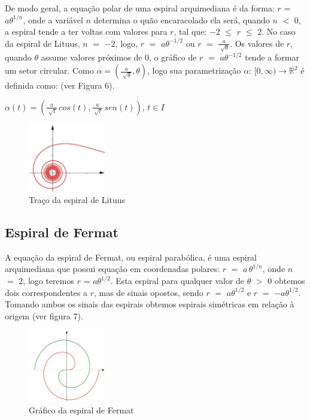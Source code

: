 \documentclass[twoside,a4paper,10pt]{article}
\newcommand{\R}{\mathbb R} %
\begin{document}
De modo geral, a equação polar de uma espiral arquimediana é da forma: $r$ = $a\theta^{1/n}$, onde a variável $n$ determina o quão encaracolado ela será, quando $n$ $<$ $0$, a espiral tende a ter voltas com valores para $r$, tal que: $-2$ $\leq$ $r$ $\leq$ $2$. No caso da espiral de Lituus, $n$ $=$ $-2$, logo, $r$ $=$ $a\theta^{-1/2}$ ou $r$ $=$ $\frac{a}{\sqrt[]{\theta}}$. Os valores de $r$, quando $\theta$ assume valores próximos de $0$, o gráfico de $r$ $=$ $a\theta^{-1/2}$ tende a formar um setor circular. Como $\alpha = \left(\frac{a}{\sqrt[]{\theta}}, \theta\right)$, logo sua parametrização $\alpha$: $[0, \infty) \rightarrow \R^2$ é definida como: (ver Figura 6).

\begin{center}
	$\alpha(t) = \left(\frac{a}{\sqrt[]{t}}\,cos(t), \frac{a}{\sqrt[]{t}}\,sen(t)\right)$, $t\in I$
\end{center}

\begin{figure}[h!]
	\centering
	\includegraphics[width=0.3\textwidth]{lituus}
	\caption{Traço da espiral de Lituus}
\end{figure}

\subsection{Espiral de Fermat}

A equação da espiral de Fermat, ou espiral parabólica, é uma espiral arquimediana que possui equação em coordenadas polares: $r$ $=$ $a\,\theta^{1/n}$, onde $n$ $=$ $2$, logo teremos $r$ = $a\theta^{1/2}$. Esta espiral para qualquer valor de $\theta$ $>$ $0$ obtemos dois correspondentes a $r$, mas de sinais opostos, sendo $r$ $=$ $a\theta^{1/2}$ e $r$ $=$ $-a\theta^{1/2}$. Tomando ambos os sinais das espirais obtemos espirais simétricas em relação à origem (ver figura 7).

\begin{figure}[h!]
	\centering
	\includegraphics[width=0.3\textwidth]{fermat}
	\caption{Gráfico da espiral de Fermat}
\end{figure}
\end{document}
